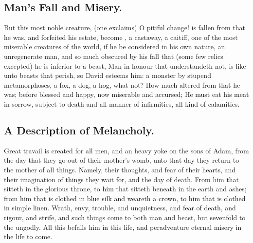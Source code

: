 {\subsection{Man's Fall and Misery.}
But this most noble creature,  (one exclaims) O pitiful change! is fallen from that he was, and forfeited his estate, become , a castaway, a caitiff, one of the most miserable creatures of the world, if he be considered in his own nature, an unregenerate man, and so much obscured by his fall that (some few relics excepted) he is inferior to a beast, Man in honour that understandeth not, is like unto beasts that perish, so David esteems him: a monster by stupend metamorphoses, a fox, a dog, a hog, what not?  How much altered from that he was; before blessed and happy, now miserable and accursed; He must eat his meat in sorrow, subject to death and all manner of infirmities, all kind of calamities.

\subsection{A Description of Melancholy.}
Great travail is created for all men, and an heavy yoke on the sons of Adam, from the day that they go out of their mother's womb, unto that day they return to the mother of all things. Namely, their thoughts, and fear of their hearts, and their imagination of things they wait for, and the day of death. From him that sitteth in the glorious throne, to him that sitteth beneath in the earth and ashes; from him that is clothed in blue silk and weareth a crown, to him that is clothed in simple linen. Wrath, envy, trouble, and unquietness, and fear of death, and rigour, and strife, and such things come to both man and beast, but sevenfold to the ungodly. All this befalls him in this life, and peradventure eternal misery in the life to come.

}
